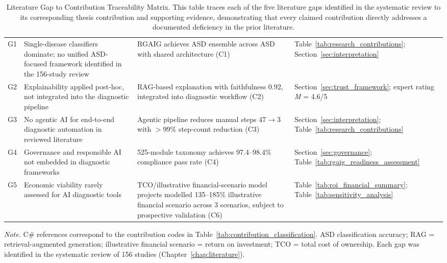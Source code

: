 \begin{table}[H]
\tablestripes\tablefontsize
\tablefontsize
\caption[Literature Gap to Contribution Traceability Matrix]{Literature Gap to Contribution Traceability Matrix. This table traces each of the five literature gaps identified in the systematic review to its corresponding thesis contribution and supporting evidence, demonstrating that every claimed contribution directly addresses a documented deficiency in the prior literature.}
\begin{tabularx}{\textwidth}{@{} c L L L @{}}
\toprule
{} &  &  &  \\
\midrule
G1 & Single-disease classifiers dominate; no unified ASD-focused framework identified in the 156-study review & RGAIG achieves ASD ensemble \asdacc{} across ASD with shared architecture (C1) & Table~\ref{tab:research_contributions}; Section~\ref{sec:interpretation} \\
\addlinespace
G2 & Explainability applied post-hoc, not integrated into the diagnostic pipeline & RAG-based explanation with faithfulness 0.92, integrated into diagnostic workflow (C2) & Section~\ref{sec:trust_framework}; expert rating \textit{M} = 4.6/5 \\
\addlinespace
G3 & No agentic AI for end-to-end diagnostic automation in reviewed literature & Agentic pipeline reduces manual steps 47$\to$3 with $>$99\% step-count reduction (C3) & Section~\ref{sec:interpretation}; Table~\ref{tab:research_contributions} \\
\addlinespace
G4 & Governance and responsible AI not embedded in diagnostic frameworks & 525-module taxonomy achieves 97.4--98.4\% compliance pass rate (C4) & Section~\ref{sec:governance}; Table~\ref{tab:rgaig_readiness_assessment} \\
\addlinespace
G5 & Economic viability rarely assessed for AI diagnostic tools & TCO/illustrative financial-scenario model projects modelled 135--185\% illustrative financial scenario across 3 scenarios, subject to prospective validation (C6) & Table~\ref{tab:roi_financial_summary}; Table~\ref{tab:sensitivity_analysis} \\
\bottomrule
\end{tabularx}
\vspace{0.5em}\noindent\textit{Note.} C\# references correspond to the contribution codes in Table~\ref{tab:contribution_classification}. ASD classification accuracy; RAG = retrieval-augmented generation; illustrative financial scenario = return on investment; TCO = total cost of ownership. Each gap was identified in the systematic review of 156 studies (Chapter~\ref{chap:literature}).
\end{table}

